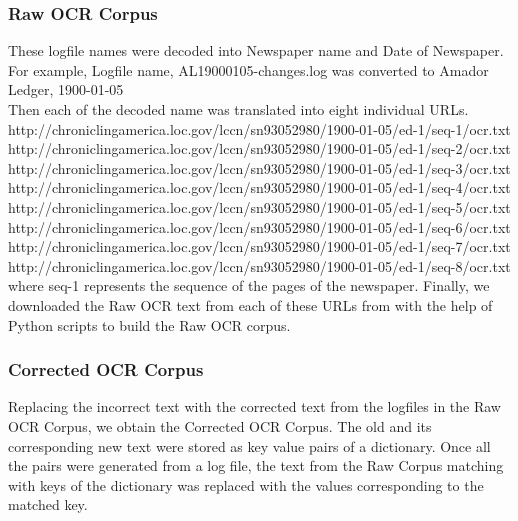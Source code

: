 \subsubsection{Raw OCR Corpus}
These logfile names were decoded into Newspaper name  and Date of Newspaper. \\
For example, Logfile name, AL19000105-changes.log was converted to Amador Ledger, 1900-01-05 \\
Then each of the decoded name was translated into eight individual URLs.\\
http://chroniclingamerica.loc.gov/lccn/sn93052980/1900-01-05/ed-1/seq-1/ocr.txt\\
http://chroniclingamerica.loc.gov/lccn/sn93052980/1900-01-05/ed-1/seq-2/ocr.txt\\
http://chroniclingamerica.loc.gov/lccn/sn93052980/1900-01-05/ed-1/seq-3/ocr.txt\\
http://chroniclingamerica.loc.gov/lccn/sn93052980/1900-01-05/ed-1/seq-4/ocr.txt\\
http://chroniclingamerica.loc.gov/lccn/sn93052980/1900-01-05/ed-1/seq-5/ocr.txt\\
http://chroniclingamerica.loc.gov/lccn/sn93052980/1900-01-05/ed-1/seq-6/ocr.txt\\
http://chroniclingamerica.loc.gov/lccn/sn93052980/1900-01-05/ed-1/seq-7/ocr.txt\\
http://chroniclingamerica.loc.gov/lccn/sn93052980/1900-01-05/ed-1/seq-8/ocr.txt\\
where seq-1 represents the sequence of the pages of the newspaper.
Finally, we downloaded the Raw OCR text from each of these URLs from \cite{datasource} with the help of Python scripts to build the Raw OCR corpus.\\

\subsubsection{Corrected OCR Corpus}
Replacing the incorrect text with the corrected text from the logfiles in the Raw OCR Corpus, we obtain the Corrected OCR Corpus. The old and its corresponding new text were stored as key value pairs of a dictionary. Once all the pairs were generated from a log file, the text from the Raw Corpus matching with keys of the dictionary was replaced with the values corresponding to the matched key. \\

